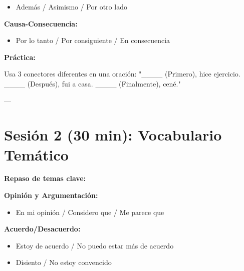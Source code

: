 \documentclass[a4paper,11pt]{article}
\begin{document}
\begin{itemize}

  \item Además / Asimismo / Por otro lado

\end{itemize}

\vspace{0.2cm}

\textbf{Causa-Consecuencia:}

\begin{itemize}

  \item Por lo tanto / Por consiguiente / En consecuencia

\end{itemize}

\vspace{0.2cm}

\textbf{Práctica:}

Usa 3 conectores diferentes en una oración: "____ (Primero), hice ejercicio. ____ (Después), fui a casa. ____ (Finalmente), cené."

\vspace{0.2cm}

---

\vspace{0.2cm}

\section{Sesión 2 (30 min): Vocabulario Temático}

\vspace{0.2cm}

\textbf{Repaso de temas clave:}

\vspace{0.2cm}

\textbf{Opinión y Argumentación:}

\begin{itemize}

  \item En mi opinión / Considero que / Me parece que

\end{itemize}

\vspace{0.2cm}

\textbf{Acuerdo/Desacuerdo:}

\begin{itemize}

  \item Estoy de acuerdo / No puedo estar más de acuerdo

  \item Disiento / No estoy convencido

\end{itemize}
\end{document}
